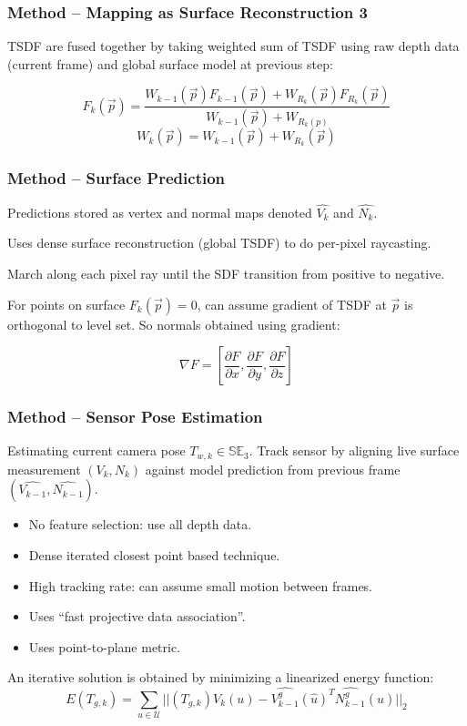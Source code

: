 \begin{frame}
\frametitle{Method -- Mapping as Surface Reconstruction 3}

TSDF are fused together by taking weighted sum of TSDF using raw depth data
(current frame) and global surface model at previous step:

\[ F_k(\vec{p}) = \frac{W_{k-1}(\vec{p}) F_{k-1}(\vec{p}) + W_{R_k}(\vec{p})F_{R_k}(\vec{p})}
{W_{k-1}(\vec{p}) + W_{R_k(p)}} \]
\[ W_k(\vec{p}) = W_{k-1}(\vec{p}) + W_{R_k}(\vec{p}) \]
\end{frame}

\begin{frame}
  \frametitle{Method -- Surface Prediction}

Predictions stored as vertex and normal maps denoted $\hat{V_k}$ and $\hat{N_k}$.

Uses dense surface reconstruction (global TSDF) to do per-pixel raycasting.

March along each pixel ray until the SDF transition from positive
to negative.

For points on surface $F_k(\vec{p}) = 0$, can assume gradient of TSDF at $\vec{p}$
is orthogonal to level set. So normals obtained using gradient:

\[ \nabla F = \left[ \frac{\partial F}{\partial x}, \frac{\partial F}{\partial y}, \frac{\partial F}{\partial z}\right] \]

\end{frame}

\begin{frame}
  \frametitle{Method -- Sensor Pose Estimation}
  Estimating current camera pose $T_{w,k} \in \mathbb{SE}_3$.
  Track sensor by aligning live surface measurement $(V_k, N_k)$ against
  model prediction from previous frame $(\hat{V_{k-1}}, \hat{N_{k-1}})$.
\begin{itemize}
  \item No feature selection: use all depth data.
  \item Dense iterated closest point based technique.
  \item High tracking rate: can assume small motion between frames.
  \item Uses ``fast projective data association''.
  \item Uses point-to-plane metric.
\end{itemize}
An iterative solution is obtained by minimizing a linearized energy function:
\[ E(T_{g,k}) = \sum_{u \in \mathcal{U}} ||(T_{g,k})V_k(u) - \hat{V_{k-1}^g}(\hat{u})^T \hat{N_{k-1}^g}(\hat{u})||_2 \]

\end{frame}
